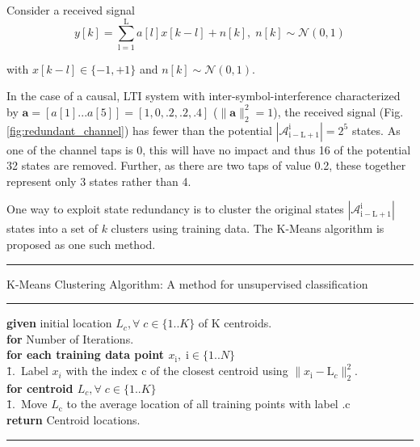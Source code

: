 \documentclass[12pt,a4paper]{article}
\begin{document}
Consider a received signal
\begin{equation*}
y[k] = \sum_{\mathrm{l=1}}^{\mathrm{L}} a[l]x[k-l] + n[k], \; n[k]  \sim \mathcal{N}(0,1)
\end{equation*}

with $x[k-l] \in \{ -1, +1\}$ and $n[k]  \sim \mathcal{N}(0,1)$.  

In the case of a causal, LTI system with inter-symbol-interference characterized by $\mathbf{a} = [a[1]...a[5]]=[1, 0, .2, .2, .4]$ ($\|\mathbf{a}\|^2_2 = 1$), the received signal (Fig.\ref{fig:redundant_channel}) has fewer than the potential $|\mathcal{A}_{\mathrm{i-L+1}}^{\mathrm{i}}| =2^5$ states. As one of the channel taps is 0, this will have no impact and thus 16 of the potential 32 states are removed. Further, as there are two taps of value 0.2, these together represent only 3 states rather than 4. 


One way to exploit state redundancy is to cluster the original states $|\mathcal{A}_{\mathrm{i-L+1}}^{\mathrm{i}}|$  states into a set of $k$ clusters using training data. The K-Means algorithm is proposed as one such method.
\\

    \noindent\rule[16pt]{\textwidth}{0.6pt}
K-Means Clustering Algorithm: A method for unsupervised classification

    \noindent\rule[10pt]{\textwidth}{0.4pt}
    {\footnotesize
    \begin{tabbing}
    {\bf given} initial location $L_c, \forall \;c  \in \{1..K\}$ of K centroids.\\
        {\textbf{for} Number of Iterations}.\\
         \qquad \= {\bf for each training data point $x_{\mathrm{i}}, \;\mathrm{i}  \in \{1..N\}$}\\
        \qquad \qquad \= 1.\ Label $x_i$ with the index c of the closest centroid using $\|x_{\mathrm{i}}- \text{L}_c\|^2_2$. \\
        \qquad \= {\bf for centroid $L_c, \forall \;c  \in \{1..K\}$}\\
                \qquad \qquad \= 1.\ Move $L_{\mathrm{c}}$ to the average location of all training points with label .c\\


        {\bf return} Centroid locations.
    \end{tabbing}}
    \noindent\rule[10pt]{\textwidth}{0.4pt}
    
\end{document}
